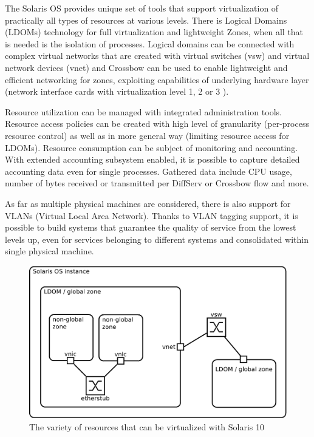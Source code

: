 \documentclass[11pt]{book}
\begin{document}
      The Solaris OS provides unique set of tools that support virtualization of practically all types of resources at
      various levels. There is Logical Domains (LDOMs) technology for full virtualization and lightweight Zones, when
      all that is needed is the isolation of processes. Logical domains can be connected with complex virtual networks
      that are created with virtual switches (vsw) and virtual network devices (vnet) \cite{ldomag} and Crossbow can be
      used to enable lightweight and efficient networking for zones, exploiting capabilities of underlying hardware
      layer (network interface cards with virtualization level 1, 2 or 3 \cite{santos}).

      Resource utilization can be managed with integrated administration tools. Resource access policies can be created
      with high level of granularity (per-process resource control) as well as in more general way (limiting resource
      access for LDOMs). Resource consumption can be subject of monitoring and accounting. With extended accounting
      subsystem enabled, it is possible to capture detailed accounting data even for single processes. Gathered data
      include CPU usage, number of bytes received or transmitted per DiffServ or Crossbow flow and more.

      As far as multiple physical machines are considered, there is also support for VLANs (Virtual Local Area Network).
      Thanks to VLAN tagging support, it is possible to build systems that guarantee the quality of service from the
      lowest levels up, even for services belonging to different systems and consolidated within single physical machine.

      \begin{figure}[H]
        \begin{center}
          \includegraphics[width=.7\textwidth]{img/solaris/full-featured.pdf}
        \end{center}

        \caption{The variety of resources that can be virtualized with Solaris 10}
      \end{figure}
\end{document}

